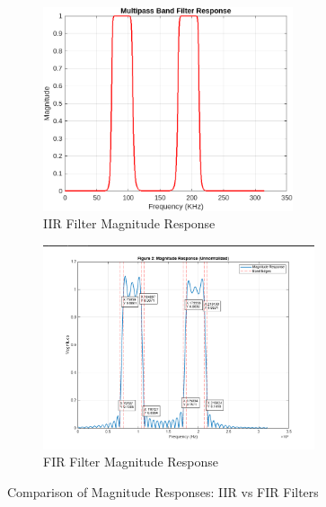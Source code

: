 \documentclass[12pt]{article}
\begin{document}
\vspace{0.5cm}
\begin{figure}[H]
    \centering
    \begin{subfigure}{0.48\textwidth}
        \centering
        \includegraphics[height=6cm]{combined_magnitude_response.png} %
        \caption{IIR Filter Magnitude Response}
        \label{fig:iir_mag}
    \end{subfigure}
    \hfill
    \begin{subfigure}{0.48\textwidth}
        \centering
        \includegraphics[height=6cm]{2.png} %
        \caption{FIR Filter Magnitude Response}
        \label{fig:fir_mag}
    \end{subfigure}
    \caption{Comparison of Magnitude Responses: IIR vs FIR Filters}
    \label{fig:iir_vs_fir}
\end{figure}
\end{document}
